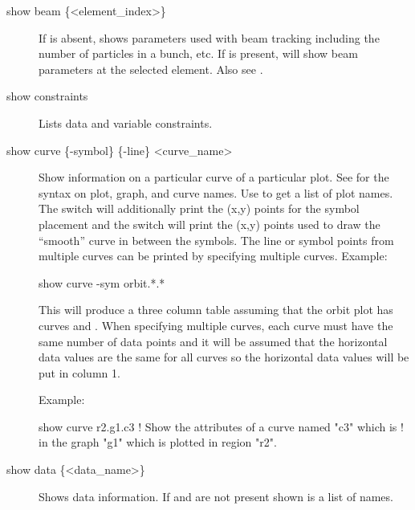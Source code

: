 {{{{\begin{description}

  \item[show beam \{<element\_index>\}] \Newline
If  is absent,  shows parameters 
used with beam tracking including the number of particles in a bunch, etc.
If  is present,  will show 
beam parameters at the selected element. Also see .


  \item[show constraints] \Newline
Lists data and variable constraints.


  \item[show curve \{-symbol\} \{-line\} <curve\_name>] \Newline
Show information on a particular curve of a particular plot. See
 for the syntax on plot, graph, and curve names.  Use
 to get a list of plot names. The  switch
will additionally print the (x,y) points for the symbol placement and
the  switch will print the (x,y) points used to draw the
``smooth'' curve in between the symbols. The line or symbol points
from multiple curves can be printed by specifying multiple curves. Example:
\begin{example}
  show curve -sym orbit.*.*
\end{example}
This will produce a three column table assuming that the orbit plot
has curves  and . When specifying
multiple curves, each curve must have the same number of data points
and it will be assumed that the horizontal data values are the same
for all curves so the horizontal data values will be put in column 1.

Example:
\begin{example}
  show curve r2.g1.c3         ! Show the attributes of a curve named "c3" which is 
                              !   in the graph "g1" which is plotted in region "r2".
\end{example}


  \item[show data \{<data\_name>\}] \Newline
Shows data information. If  and  are not
present shown is a list of  names.


\end{description}}}}}
